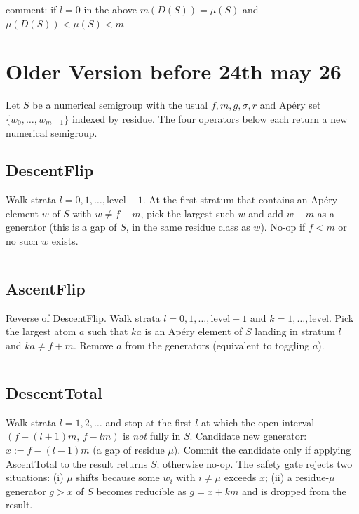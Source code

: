 \documentclass[11pt, a4paper]{article}
\begin{document}
comment: if $l=0$ in the above $m(D(S))=\mu(S)$ and $\mu(D(S))<\mu(S)<m$







\section{Older Version before 24th may 26}

Let $S$ be a numerical semigroup with the usual $f, m, g, \sigma, r$
and Apéry set $\{w_0, \dots, w_{m-1}\}$ indexed by residue. The four
operators below each return a new numerical semigroup.

\subsection{DescentFlip}
Walk strata $l = 0, 1, \dots, \mathrm{level} - 1$. At the first
stratum that contains an Apéry element $w$ of $S$ with $w \ne f+m$,
pick the largest such $w$ and add $w - m$ as a generator (this is a
gap of $S$, in the same residue class as $w$). No-op if $f < m$ or no
such $w$ exists.

\inputminted[firstline=262,lastline=280]{rust}{../crates/semigroup_math/src/math/manipulators.rs}

\subsection{AscentFlip}
Reverse of DescentFlip. Walk strata $l = 0, 1, \dots, \mathrm{level}-1$
and $k = 1, \dots, \mathrm{level}$. Pick the largest atom $a$ such
that $k a$ is an Apéry element of $S$ landing in stratum $l$ and
$k a \ne f + m$. Remove $a$ from the generators (equivalent to
toggling $a$).

\inputminted[firstline=300,lastline=322]{rust}{../crates/semigroup_math/src/math/manipulators.rs}

\subsection{DescentTotal}
Walk strata $l = 1, 2, \dots$ and stop at the first $l$ at which
the open interval $(f - (l+1)m,\, f - l m)$ is \emph{not} fully in
$S$. Candidate new generator: $x := f - (l-1)m$ (a gap of residue
$\mu$). Commit the candidate only if applying AscentTotal to the
result returns $S$; otherwise no-op. The safety gate rejects two
situations: (i) $\mu$ shifts because some $w_i$ with $i \ne \mu$
exceeds $x$; (ii) a residue-$\mu$ generator $g > x$ of $S$ becomes
reducible as $g = x + km$ and is dropped from the result.
\end{document}
